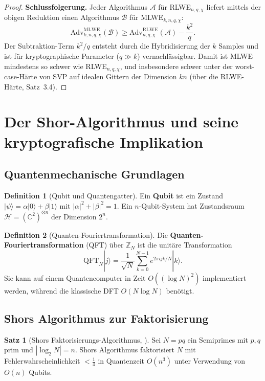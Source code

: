 ﻿\documentclass[a4paper,12pt]{article}
\theoremstyle{definition}
\newtheorem{definition}{Definition}[section]
\newtheorem{satz}{Satz}[section]
\begin{document}
\begin{proof}
\textbf{Schlussfolgerung.}
Jeder Algorithmus $\mathcal{A}$ für RLWE$_{n,q,\chi}$ liefert mittels der
obigen Reduktion einen Algorithmus $\mathcal{B}$ für MLWE$_{k,n,q,\chi}$:
\[
  \mathrm{Adv}^\mathrm{MLWE}_{k,n,q,\chi}(\mathcal{B})
  \geq \mathrm{Adv}^\mathrm{RLWE}_{n,q,\chi}(\mathcal{A}) - \frac{k^2}{q}.
\]
Der Subtraktion-Term $k^2/q$ entsteht durch die Hybridisierung der $k$ Samples
und ist für kryptographische Parameter ($q \gg k$) vernachlässigbar.
Damit ist MLWE mindestens so schwer wie RLWE$_{n,q,\chi}$, und
insbesondere schwer unter der worst-case-Härte von SVP auf idealen Gittern
der Dimension $kn$ (über die RLWE-Härte, Satz~3.4).
\end{proof}

\section{Der Shor-Algorithmus und seine kryptografische Implikation}

\subsection{Quantenmechanische Grundlagen}

\begin{definition}[Qubit und Quantengatter]
Ein \textbf{Qubit} ist ein Zustand $|\psi\rangle = \alpha|0\rangle + \beta|1\rangle$
mit $|\alpha|^2 + |\beta|^2 = 1$. Ein $n$-Qubit-System hat Zustandsraum
$\mathcal{H} = (\mathbb{C}^2)^{\otimes n}$ der Dimension $2^n$.
\end{definition}

\begin{definition}[Quanten-Fouriertransformation]
Die \textbf{Quanten-Fouriertransformation} (QFT) über $\mathbb{Z}_N$ ist die
unitäre Transformation
\[
  \mathrm{QFT}_N |j\rangle = \frac{1}{\sqrt{N}} \sum_{k=0}^{N-1} e^{2\pi i jk/N} |k\rangle.
\]
Sie kann auf einem Quantencomputer in Zeit $O((\log N)^2)$ implementiert werden,
während die klassische DFT $O(N \log N)$ benötigt.
\end{definition}

\subsection{Shors Algorithmus zur Faktorisierung}

\begin{satz}[Shors Faktorisierungs-Algorithmus, \cite{Sho94}]
\label{satz:shor}
Sei $N = pq$ ein Semiprimes mit $p, q$ prim und $|\log_2 N| = n$.
Shors Algorithmus faktorisiert $N$ mit Fehlerwahrscheinlichkeit $< \frac{1}{4}$
in Quantenzeit $O(n^3)$ unter Verwendung von $O(n)$ Qubits.
\end{satz}
\end{document}
